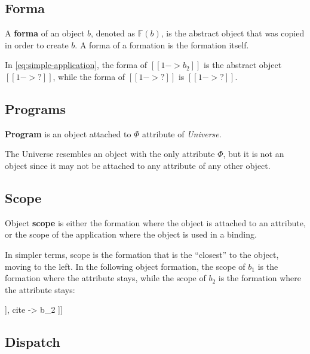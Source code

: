 \subsection{Forma}

\begin{definition}[Forma]
A \textbf{forma} of an object \(b\), denoted as \(\mathbb{F}(b)\), is the abstract object that was copied in order to create \(b\). A forma of a formation is the formation itself.
\end{definition}

In \cref{eq:simple-application}, the forma of $[[ 1-> b_2 ]]$ is the abstract object $[[ 1->? ]]$, while the forma of $[[ 1->? ]]$ is $[[ 1->? ]]$.

\subsection{Programs}

\begin{definition}[Program]
\textbf{Program} is an object attached to \(\Phi\) attribute of \emph{Universe}.
\end{definition}

The Universe resembles an object with the only attribute \(\Phi\), but it is not an object since it may not be attached to any attribute of any other object.

\subsection{Scope}

\begin{definition}[Scope]
Object \textbf{scope} is either the formation where the object is attached to an attribute, or the scope of the application where the object is used in a binding.
\end{definition}

In simpler terms, scope is the formation that is the ``closest'' to the object, moving to the left. In the following object formation, the scope of \(b_1\) is the formation where the  attribute stays, while the scope of \(b_2\) is the formation where the  attribute stays:
\begin{phiquation}
    [[ ref -> [[ source -> Q.book( author -> b_1 ) ]], cite -> b_2 ]]
\end{phiquation}

\subsection{Dispatch}

